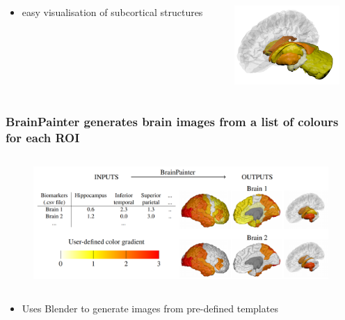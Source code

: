 \documentclass[10pt,xcolor=table,aspectratio=169]{beamer}
\begin{document}
\begin{frame}
\begin{itemize}
\begin{figure}
\end{figure}
\end{itemize}

\vspace{-1em}

\begin{columns}
 \begin{column}{0.5\textwidth}
 \begin{itemize}
   \item easy visualisation of subcortical structures
 \end{itemize}
 \end{column}
\begin{column}{0.5\textwidth}
  \includegraphics[height=3cm]{images/DK_output/Image_1_subcortical}
\end{column}
\end{columns}
 
 
 
 
 
 

\end{frame}




\begin{frame}
 \frametitle{BrainPainter generates brain images from a list of colours for each ROI}

  
\begin{figure}
\centering
\includegraphics[height=5cm]{images/diagram.png}
\end{figure}
 
\begin{itemize}
 \item Uses Blender to generate images from pre-defined templates
\end{itemize}


 
\end{frame} 
\end{document}
